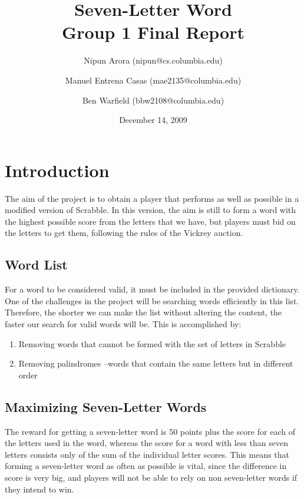 \documentclass[11pt]{article}
\begin{document}
\title{Seven-Letter Word\\Group 1 Final Report}

\author{
	Nipun Arora (nipun@cs.columbia.edu)
 \and Manuel Entrena Casas (mae2135@columbia.edu)
 \and Ben Warfield (bbw2108@columbia.edu)}

\date{December 14, 2009}
\maketitle


\newpage
\setcounter{tocdepth}{2}
\tableofcontents
\newpage

\section{ Introduction }

The aim of the project is to obtain a player that performs as well as possible in a modified version of Scrabble. In this version, the aim is still to form a word with the highest possible score from the letters that we have, but players must bid on the letters to get them, following the rules of the Vickrey auction.

\subsection{Word List}

For a word to be considered valid, it must be included in the provided dictionary. One of the challenges in the project will be searching words efficiently in this list. Therefore, the shorter we can make the list without altering the content, the faster our search for valid words will be. This is accomplished by:

\begin{enumerate}
\item Removing words that cannot be formed with the set of letters in Scrabble
\item Removing palindromes --words that contain the same letters but in different order
\end{enumerate}

\subsection{Maximizing Seven-Letter Words}

The reward for getting a seven-letter word is 50 points plus the score for each of the letters used in the word, whereas the score for a word with less than seven letters consists only of the sum of the individual letter scores. This means that forming a seven-letter word as often as possible is vital, since the difference in score is very big, and players will not be able to rely on non seven-letter words if they intend to win.
\end{document}
